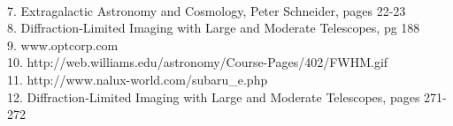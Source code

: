 \documentclass[pdf,color]{UoBnote}
\begin{document}
\\
7. Extragalactic Astronomy and Cosmology, Peter Schneider, pages 22-23
\\
8. Diffraction-Limited Imaging with Large and Moderate Telescopes, pg 188
\\
9. www.optcorp.com
\\
10. http://web.williams.edu/astronomy/Course-Pages/402/FWHM.gif
\\
11. http://www.nalux-world.com/subaru\_e.php
\\
12. Diffraction-Limited Imaging with Large and Moderate Telescopes, pages 271-272
\end{document}
